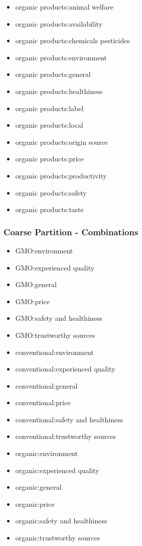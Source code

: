 \begin{multicols}{2}
\begin{itemize}[leftmargin=*]
		\item[] organic products:animal welfare
		\item[] organic products:availability 
		\item[] organic products:chemicals pesticides 
		\item[] organic products:environment
		\item[] organic products:general
		\item[] organic products:healthiness
		\item[] organic products:label 
		\item[] organic products:local 
		\item[] organic products:origin source 
		\item[] organic products:price 
		\item[] organic products:productivity 
		\item[] organic products:safety
		\item[] organic products:taste 
		\label{li:08_og_aspects} 
	\end{itemize}
\end{multicols}

\subsubsection*{Coarse Partition - Combinations}

\begin{multicols}{2}
	\begin{itemize}[leftmargin=*]
		\setlength\itemsep{-0.5em}
		\item[] GMO:environment 
		\item[] GMO:experienced quality 
		\item[] GMO:general 
		\item[] GMO:price
		\item[] GMO:safety and healthiness
		\item[] GMO:trustworthy sources 
		\item[] conventional:environment 
		\item[] conventional:experienced quality 
		\item[] conventional:general 
		\item[] conventional:price
		\item[] conventional:safety and healthiness 
		\item[] conventional:trustworthy sources 
		\item[] organic:environment 
		\item[] organic:experienced quality 
		\item[] organic:general 
		\item[] organic:price
		\item[] organic:safety and healthiness
		\item[] organic:trustworthy sources
		\label{li:08_og_aspectsCoarse}  
	\end{itemize}
\end{multicols}

